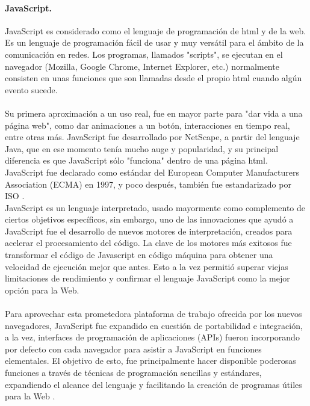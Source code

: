 \documentclass[12pt, a4paper, titlepage]{report}
\begin{document}
			\paragraph {JavaScript. \\}
			JavaScript es considerado como el lenguaje de programación de html y de la web. Es un lenguaje de programación fácil de usar y muy versátil para el ámbito de la comunicación en redes. Los programas, llamados "scripts", se ejecutan en el navegador (Mozilla, Google Chrome, Internet Explorer, etc.) normalmente consisten en unas funciones que son llamadas desde el propio html cuando algún evento sucede.\\\\
			Su primera aproximación a un uso real, fue en mayor parte para "dar vida a una página web", como dar animaciones a un botón, interacciones en tiempo real, entre otras más. 
			JavaScript fue desarrollado por \Gls{NetScape}, a partir del lenguaje Java, que en ese momento tenía mucho auge y popularidad, y su principal diferencia es que JavaScript sólo "funciona" dentro de una página html.\\
			JavaScript fue declarado como estándar del European Computer Manufacturers Association (ECMA) en 1997, y poco después, también fue estandarizado por ISO \cite{refJavaScript}. \\ 
			JavaScript es un lenguaje interpretado, usado mayormente como complemento de ciertos objetivos específicos, sin embargo, uno de las innovaciones que ayudó a JavaScript fue el desarrollo de nuevos motores de interpretación, creados para acelerar el procesamiento del código. La clave de los motores más exitosos fue transformar el código de Javascript en código máquina para obtener una velocidad de ejecución mejor que antes. Esto a la vez permitió superar viejas limitaciones de rendimiento y confirmar el lenguaje JavaScript como la mejor opción para la Web.\\\\
			
			Para aprovechar esta prometedora plataforma de trabajo ofrecida por los nuevos navegadores, JavaScript fue expandido en cuestión de portabilidad e integración, a la vez, interfaces de programación de aplicaciones (APIs) fueron incorporando por defecto con cada navegador para asistir a JavaScript en funciones elementales. El objetivo de esto, fue principalmente hacer disponible poderosas funciones a través de técnicas de programación sencillas y estándares, expandiendo el alcance del lenguaje y facilitando la creación de programas útiles para la Web \cite{refElGranLibro}.
			
\end{document}
